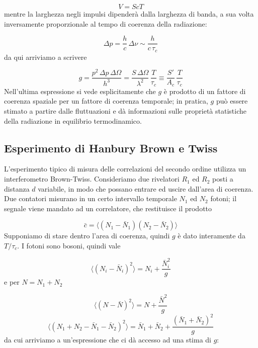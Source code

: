 \documentclass[a4paper]{report}
\begin{document}
\begin{equation}
    V = S c T
\end{equation}
mentre la larghezza negli impulsi dipenderà dalla larghezza di banda, a sua volta inversamente proporzionale al tempo di coerenza della radiazione:

\begin{equation}
    \Delta p = \frac{h}{c}\,\Delta \nu \sim \frac{h}{c\,\tau_c}
\end{equation}
da qui arriviamo a scrivere

\begin{equation}
    g = \frac{p^2\, \Delta p\,\Delta\Omega}{h^3} = \frac{S\,\Delta\Omega}{\lambda^2}\,\frac{T}{\tau_c} \equiv \frac{S'}{A_c}\,\frac{T}{\tau_c}
\end{equation}
Nell'ultima espressione si vede esplicitamente che $g$ è prodotto di un fattore di coerenza spaziale per un fattore di coerenza temporale; in pratica, $g$ può essere stimato a partire dalle fluttuazioni e dà informazioni sulle proprietà statistiche della radiazione in equilibrio termodinamico. \\

\subsection{Esperimento di Hanbury Brown e Twiss}
L'esperimento tipico di misura delle correlazioni del secondo ordine utilizza un interferometro Brown-Twiss. Consideriamo due rivelatori $R_1$ ed $R_2$ posti a distanza $d$ variabile, in modo che possano entrare ed uscire dall'area di coerenza. Due contatori misurano in un certo intervallo temporale $N_1$ ed $N_2$ fotoni; il segnale  viene mandato ad un correlatore, che restituisce il prodotto

\begin{equation}
    \bar{c} = \langle(N_1-\bar{N}_1) (N_2-\bar{N}_2)\rangle
\end{equation}
Supponiamo di stare dentro l'area di coerenza, quindi $g$ è dato interamente da $T/\tau_c$. I fotoni sono bosoni, quindi vale

\begin{equation}
    \langle(N_i - \bar{N}_i)^2\rangle = N_i + \frac{\bar{N}_i^2}{g}
\end{equation}
e per $N = N_1 + N_2$

\begin{equation}
    \langle(N - \bar{N})^2\rangle = N + \frac{\bar{N}^2}{g}
\end{equation}
\begin{equation}
    \langle(N_1+N_2 - \bar{N}_1 - \bar{N}_2)^2\rangle = \bar{N}_1 + \bar{N}_2 + \frac{(\bar{N}_1+\bar{N}_2)^2}{g}
\end{equation}
da cui arriviamo a un'espressione che ci dà accesso ad una stima di $g$:
\end{document}
